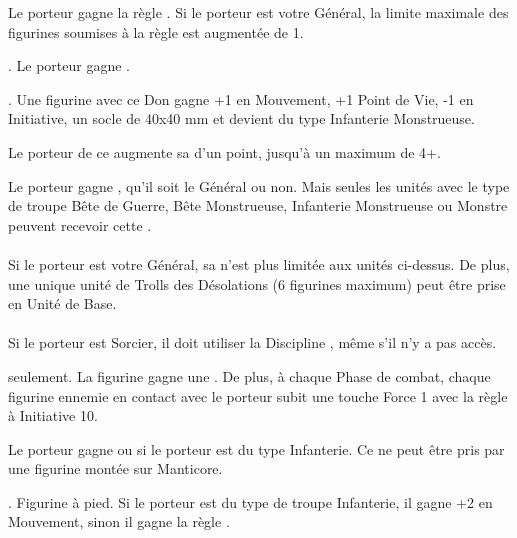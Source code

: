 \begin{multicols}{2}\raggedcolumns

\startpricelist

 Le porteur gagne la règle \terror. Si le porteur est votre Général, la limite maximale des figurines soumises à la règle \survivalofthefittest est augmentée de 1.

 . Le porteur gagne .

 . Une figurine avec ce Don gagne +1 en Mouvement, +1 Point de Vie, -1 en Initiative, un socle de 40x40 mm et devient du type Infanterie Monstrueuse.

 Le porteur de ce \giftsofthegods{} augmente sa \wardsave{} d'un point, jusqu'à un maximum de 4+.

 Le porteur gagne \inspiringpresence, qu'il soit le Général ou non. Mais seules les unités avec le type de troupe Bête de Guerre, Bête Monstrueuse, Infanterie Monstrueuse ou Monstre peuvent recevoir cette \inspiringpresence.\\
\\
Si le porteur est votre Général, sa \inspiringpresence n'est plus limitée aux unités ci-dessus. De plus, une unique unité de Trolls des Désolations (6 figurines maximum) peut être prise en Unité de Base.\\
\\
Si le porteur est Sorcier, il doit utiliser la Discipline \wilderness, même s'il n'y a pas accès.

\endpricelist

\columnbreak

\startpricelist

  seulement. La figurine gagne une \breathweapon{\ToxicAttacks{}}. De plus, à chaque Phase de combat, chaque figurine ennemie en contact avec le porteur subit une touche Force 1 avec la règle  à Initiative 10.

 Le porteur gagne  {ou  si le porteur est du type Infanterie}. Ce \giftsofthegods{} ne peut être pris par une figurine montée sur Manticore.

 . Figurine à pied. Si le porteur est du type de troupe Infanterie, il gagne +2 en Mouvement, sinon il gagne la règle \swiftstride.


\end{multicols}
